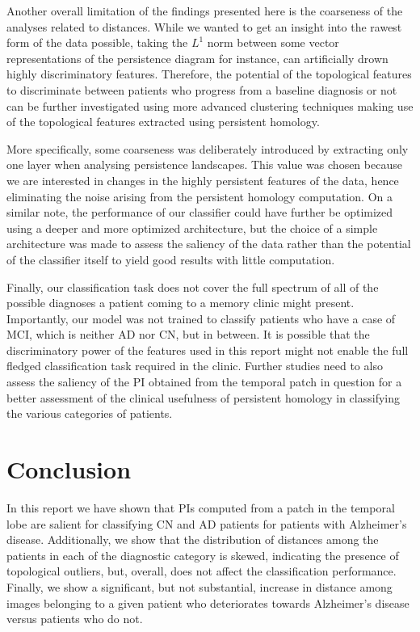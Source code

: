 \documentclass{article}
\begin{document}
Another overall limitation of the findings presented here is the coarseness of the analyses related to distances. While we wanted to get an insight into the rawest form of the data possible, taking the $L^1$ norm between some vector representations of the persistence diagram for instance, can artificially drown highly discriminatory features. Therefore, the potential of the topological features to discriminate between patients who progress from a baseline diagnosis or not can be further investigated using more advanced clustering techniques making use of the topological features extracted using persistent homology.

More specifically, some coarseness was deliberately introduced by extracting only one layer when analysing persistence landscapes. This value was chosen because we are interested in changes in the highly persistent features of the data, hence eliminating the noise arising from the persistent homology computation. On a similar note, the performance of our classifier could have further be optimized using a deeper and more optimized architecture, but the choice of a simple architecture was made to assess the saliency of the data rather than the potential of the classifier itself to yield good results with little computation.

Finally, our classification task does not cover the full spectrum of all of the possible diagnoses a patient coming to a memory clinic might present. Importantly, our model was not trained to classify patients who have a case of MCI, which is neither AD nor CN, but in between. It is possible that the discriminatory power of the features used in this report might not enable the full fledged classification task required in the clinic. Further studies need to also assess the saliency of the PI obtained from the temporal patch in question for a better assessment of the clinical usefulness of persistent homology in classifying the various categories of patients.

\section{Conclusion}

In this report we have shown that PIs computed from a patch in the temporal lobe are salient for classifying CN and AD patients for patients with Alzheimer's disease. Additionally, we show that the distribution of distances among the patients in each of the diagnostic category is skewed, indicating the presence of topological outliers, but, overall, does not affect the classification performance. Finally, we show a significant, but not substantial, increase in distance among images belonging to a given patient who deteriorates towards Alzheimer's disease versus patients who do not.
\end{document}

